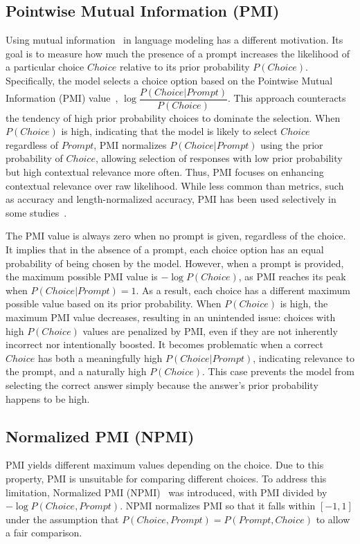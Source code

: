 \subsection{Pointwise Mutual Information (PMI)}
\label{sec:metric_mi}
Using mutual information~\citep{mutualinfo} in language modeling has a different motivation. Its goal is to measure how much the presence of a prompt increases the likelihood of a particular choice $Choice$ relative to its prior probability {\small $P(Choice)$}. Specifically, the model selects a choice option based on the Pointwise Mutual Information (PMI) value~\citep{pmi}, {\small $\log{\dfrac{P(Choice|Prompt)}{P(Choice)}}$}. This approach counteracts the tendency of high prior probability choices to dominate the selection. When {\small $P(Choice)$} is high, indicating that the model is likely to select $Choice$ regardless of $Prompt$, PMI normalizes {\small $P(Choice|Prompt)$} using the prior probability of $Choice$, allowing selection of responses with low prior probability but high contextual relevance more often. 
Thus, PMI focuses on enhancing contextual relevance over raw likelihood. While less common than metrics, such as accuracy and length-normalized accuracy, PMI has been used selectively in some studies~\citep{askell2021general, biderman2024lessons}.

The PMI value is always zero when no prompt is given, regardless of the choice. It implies that in the absence of a prompt, each choice option has an equal probability of being chosen by the model. However, when a prompt is provided, the maximum possible PMI value is {\small $-\log{P(Choice)}$}, as PMI reaches its peak when {\small $P(Choice|Prompt)=1$}. As a result, each choice has a different maximum possible value based on its prior probability. When {\small $P(Choice)$} is high, the maximum PMI value decreases, resulting in an unintended issue: choices with high {\small $P(Choice)$} values are penalized by PMI, even if they are not inherently incorrect nor intentionally boosted. It becomes problematic when a correct $Choice$ has both a meaningfully high {\small $P(Choice|Prompt)$}, indicating relevance to the prompt, and a naturally high {\small $P(Choice)$}. This case prevents the model from selecting the correct answer simply because the answer's prior probability happens to be high.

\subsection{Normalized PMI (NPMI)}
\label{sec:metric_npmi}
PMI yields different maximum values depending on the choice. Due to this property, PMI is unsuitable for comparing different choices. To address this limitation, Normalized PMI (NPMI)~\citep{bouma2009normalized} was introduced, with PMI divided by {\small $-\log P(Choice, Prompt)$}.
NPMI normalizes PMI so that it falls within $[-1, 1]$ under the assumption that {\small $P(Choice,Prompt)=P(Prompt,Choice)$} to allow a fair comparison.


